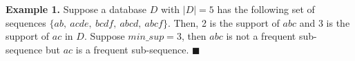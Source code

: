 {\bfseries \noindent Example 1.} Suppose a database $D$ with $|D| = 5$ has the
following set of sequences $\{ ab, ~ acde, ~ bcdf, ~ abcd, ~ abcf \}$. Then, 2
is the support of $abc$ and 3 is the support of $ac$ in $D$. Suppose 
$min\_sup = 3$, then $abc$ is not a frequent sub-sequence but $ac$ is a frequent
sub-sequence. $\blacksquare$


 

\lipsum[1-4]
